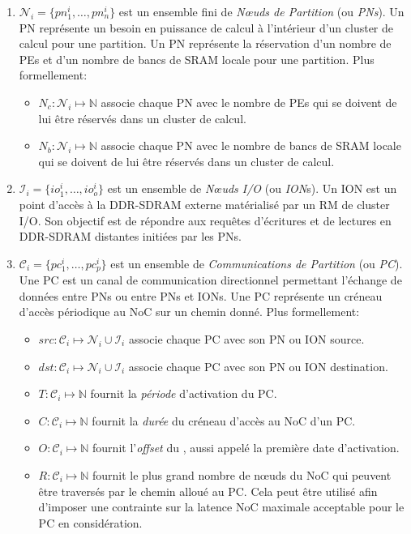 \documentclass[main.tex]{subfiles}
\begin{document}
\begin{enumerate}
        \item  $\mathcal{N}_i = \{ pn_1^i , \ldots , pn_n^i \}$ est un ensemble fini de \emph{N\oe{}uds de Partition} (ou \emph{PNs}). Un PN représente un besoin en puissance de calcul à l'intérieur d'un cluster de calcul pour une partition. Un PN représente la réservation d'un nombre de PEs et d'un nombre de bancs de SRAM locale pour une partition. Plus formellement:
            \begin{itemize}
                \item $N_c : \mathcal{N}_i \mapsto \mathbb{N}$ associe chaque PN avec le nombre de PEs qui se doivent de lui être réservés dans un cluster de calcul.
                \item $N_b : \mathcal{N}_i \mapsto \mathbb{N}$ associe chaque PN avec le nombre de bancs de SRAM locale qui se doivent de lui être réservés dans un cluster de calcul.
            \end{itemize}

        \item $\mathcal{I}_i = \{ io_1^i , \ldots , io_o^i \}$ est un ensemble de \emph{N\oe{}uds I/O} (ou \emph{ION}s). Un ION est un point d'accès à la DDR-SDRAM externe matérialisé par un RM de cluster I/O. Son objectif est de répondre aux requêtes d'écritures et de lectures en DDR-SDRAM distantes initiées par les PNs.

        \item $\mathcal{C}_i = \{ pc_1^i , \ldots , pc_p^i \}$ est un ensemble de \emph{Communications de Partition} (ou \emph{PC}). Une PC est un canal de communication directionnel permettant l'échange de données entre PNs ou entre PNs et IONs. Une PC représente un créneau d'accès périodique au NoC sur un chemin donné. Plus formellement:
            \begin{itemize}
                \item $src : \mathcal{C}_i \mapsto \mathcal{N}_i \cup \mathcal{I}_i$ associe chaque PC avec son PN ou ION source.
                \item $dst : \mathcal{C}_i \mapsto \mathcal{N}_i \cup \mathcal{I}_i$ associe chaque PC avec son PN ou ION destination.
                \item $T : \mathcal{C}_i \mapsto \mathbb{N}$ fournit la \emph{période} d'activation du PC.
                \item $C : \mathcal{C}_i \mapsto \mathbb{N}$ fournit la \emph{durée} du créneau d'accès au NoC d'un PC.
                \item $O : \mathcal{C}_i \mapsto \mathbb{N}$ fournit l'\emph{offset} du \PC{}, aussi appelé la première date d'activation.
                \item $R : \mathcal{C}_i \mapsto \mathbb{N}$ fournit le plus grand nombre de n\oe{}uds du NoC qui peuvent être traversés par le chemin alloué au PC. Cela peut être utilisé afin d'imposer une contrainte sur la latence NoC maximale acceptable pour le PC en considération.


\end{itemize}
\end{enumerate}
\end{document}
